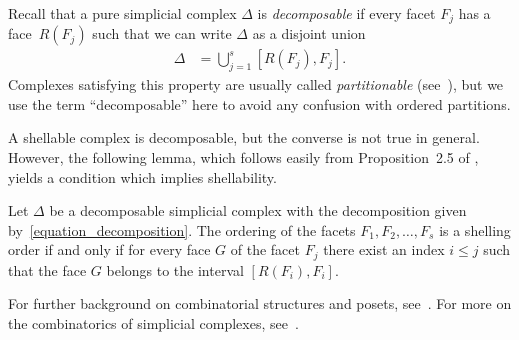 \documentclass[ALCO,ThmDefs,Unicode,epreuves]{cedram}
\newcommand{\cupdots}{\cup \cdots \cup}
\newcommand{\vanish}[1]{}
\begin{document}
Recall that a pure simplicial complex $\Delta$ 
is \emph{decomposable} if 
every facet $F_{j}$ has a face~$R(F_{j})$ such that
we can write $\Delta$ as
a disjoint union
\begin{align}
\Delta & = \bigcup_{j=1}^{s} [R(F_{j}), F_{j}] .
\label{equation_decomposition}
\end{align}
Complexes satisfying this property are usually called
\emph{partitionable} (see~\cite{Stanley_green}), but we use the term ``decomposable''
here to avoid any confusion with ordered partitions.

A shellable complex is decomposable,
but the converse is not true in general.
However, the following lemma, which follows
easily from Proposition~2.5 of
\cite{Bjorner_Wachs},
yields a condition
which implies shellability.



\begin{lemma}
Let $\Delta$ be a decomposable simplicial complex
with the decomposition
given by~\eqref{equation_decomposition}.
The ordering of the facets
$F_{1}, F_{2}, \ldots, F_{s}$ is a shelling order
if and only if for every face $G$ of the facet $F_{j}$
there exist an index $i \leq j$
such that the face $G$ belongs to
the interval $[R(F_{i}), F_{i}]$.
\label{lemma_shelling_condition}
\end{lemma}

\vanish{
\begin{proof}
We proceed by induction on $j$.
When $j=1$ the condition implies that
$R(F_{1})$ is the empty face, and hence
$\overline{F_{1}}$ is a shellable complex.
Assume now that
$\overline{F_{1}} \cupdots \overline{F_{j-1}}$
is a shellable complex,
that is,
$\overline{F_{1}} \cupdots \overline{F_{j-1}}
=
\bigcup_{i=1}^{j-1} [R(F_{i}), F_{i}]$.
Then any face of $F_{j}$ is either already a face
of $\overline{F_{1}} \cupdots \overline{F_{j-1}}$ 
or a face of $\overline{F_{j}} - \overline{F_{1}} \cupdots \overline{F_{j-1}}$ 
Hence the intersection
$(\overline{F_{1}} \cupdots \overline{F_{j-1}}) \cap \overline{F_{j}}$
is the complement of the interval $[R(F_{j}), F_{j}]$ in~$\overline{F_{j}}$,
proving that
$F_{1}, F_{2}, \ldots, F_{j}$ is a shelling order
and completing the induction.
\end{proof}
}

For further background on combinatorial structures and posets,
see~\cite{Stanley_EC_1}.
For more on the combinatorics of simplicial complexes,
see~\cite{Stanley_green}.
\end{document}
